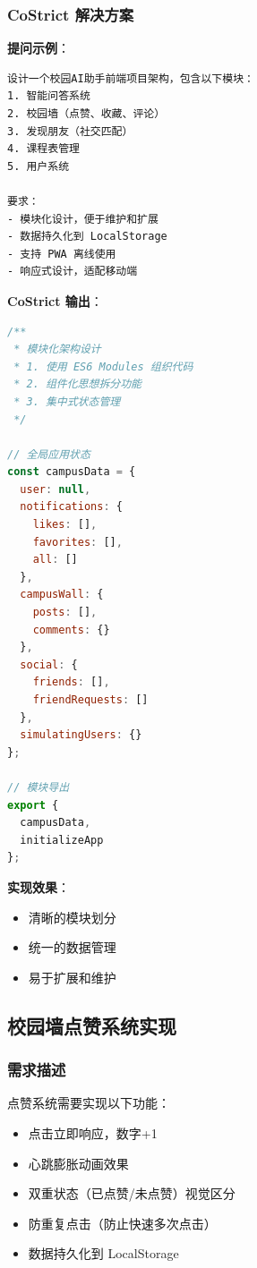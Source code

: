 ﻿\documentclass[12pt,a4paper]{article}
\begin{document}
\subsubsection{CoStrict 解决方案}

\textbf{提问示例}：
\begin{verbatim}
设计一个校园AI助手前端项目架构，包含以下模块：
1. 智能问答系统
2. 校园墙（点赞、收藏、评论）
3. 发现朋友（社交匹配）
4. 课程表管理
5. 用户系统

要求：
- 模块化设计，便于维护和扩展
- 数据持久化到 LocalStorage
- 支持 PWA 离线使用
- 响应式设计，适配移动端
\end{verbatim}

\textbf{CoStrict 输出}：

\begin{lstlisting}[language=JavaScript, caption={模块化架构设计}]
/**
 * 模块化架构设计
 * 1. 使用 ES6 Modules 组织代码
 * 2. 组件化思想拆分功能
 * 3. 集中式状态管理
 */

// 全局应用状态
const campusData = {
  user: null,
  notifications: {
    likes: [],
    favorites: [],
    all: []
  },
  campusWall: {
    posts: [],
    comments: {}
  },
  social: {
    friends: [],
    friendRequests: []
  },
  simulatingUsers: {}
};

// 模块导出
export {
  campusData,
  initializeApp
};
\end{lstlisting}

\textbf{实现效果}：
\begin{itemize}
    \item 清晰的模块划分
    \item 统一的数据管理
    \item 易于扩展和维护
\end{itemize}

\subsection{校园墙点赞系统实现}

\subsubsection{需求描述}

点赞系统需要实现以下功能：
\begin{itemize}
    \item 点击立即响应，数字+1
    \item 心跳膨胀动画效果
    \item 双重状态（已点赞/未点赞）视觉区分
    \item 防重复点击（防止快速多次点击）
    \item 数据持久化到 LocalStorage
\end{itemize}
\end{document}
